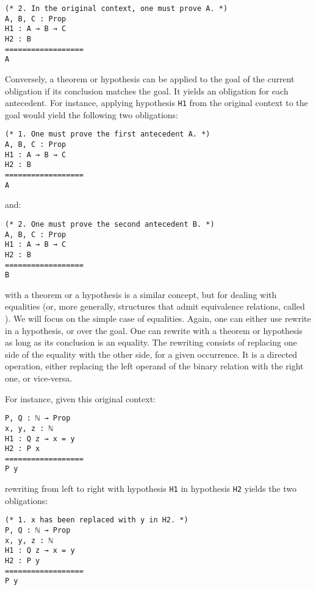\begin{verbatim}
(* 2. In the original context, one must prove A. *)
A, B, C : Prop
H1 : A → B → C
H2 : B
==================
A
\end{verbatim}

Conversely, a theorem or hypothesis can be applied to the goal of the current
obligation if its conclusion matches the goal.  It yields an obligation for each
antecedent.  For instance, applying hypothesis \texttt{H1} from the
original context to the goal would yield the following two obligations:

\begin{verbatim}
(* 1. One must prove the first antecedent A. *)
A, B, C : Prop
H1 : A → B → C
H2 : B
==================
A
\end{verbatim}

and:

\begin{verbatim}
(* 2. One must prove the second antecedent B. *)
A, B, C : Prop
H1 : A → B → C
H2 : B
==================
B
\end{verbatim}

 with a theorem or a hypothesis is a similar concept, but for
dealing with equalities (or, more generally, structures that admit equivalence
relations, called ).  We will focus on the simple case of
equalities.  Again, one can either use rewrite in a hypothesis, or over the
goal.  One can rewrite with a theorem or hypothesis as long as its conclusion is
an equality.  The rewriting consists of replacing one side of the equality with
the other side, for a given occurrence.  It is a directed operation, either
replacing the left operand of the binary relation with the right one, or
vice-versa.

For instance, given this original context:

\begin{verbatim}
P, Q : ℕ → Prop
x, y, z : ℕ
H1 : Q z → x = y
H2 : P x
==================
P y
\end{verbatim}

rewriting from left to right with hypothesis \texttt{H1} in hypothesis
\texttt{H2} yields the two obligations:

\begin{verbatim}
(* 1. x has been replaced with y in H2. *)
P, Q : ℕ → Prop
x, y, z : ℕ
H1 : Q z → x = y
H2 : P y
==================
P y
\end{verbatim}

